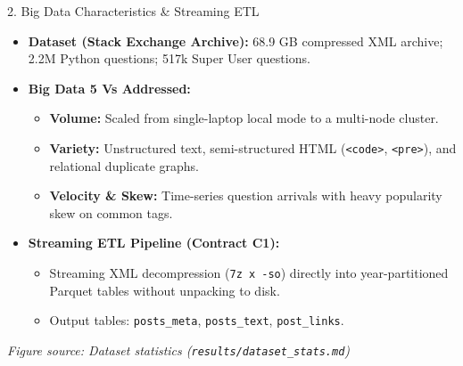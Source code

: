 \documentclass[aspectratio=169,10pt]{beamer}
\begin{document}
\begin{frame}{2. Big Data Characteristics \& Streaming ETL}
  \begin{itemize}
    \item \textbf{Dataset (Stack Exchange Archive):} 68.9 GB compressed XML archive; 2.2M Python questions; 517k Super User questions.
    \item \textbf{Big Data 5 Vs Addressed:}
      \begin{itemize}
        \item \textbf{Volume:} Scaled from single-laptop local mode to a multi-node cluster.
        \item \textbf{Variety:} Unstructured text, semi-structured HTML (\texttt{<code>}, \texttt{<pre>}), and relational duplicate graphs.
        \item \textbf{Velocity \& Skew:} Time-series question arrivals with heavy popularity skew on common tags.
      \end{itemize}
    \item \textbf{Streaming ETL Pipeline (Contract C1):}
      \begin{itemize}
        \item Streaming XML decompression (\texttt{7z x -so}) directly into year-partitioned Parquet tables without unpacking to disk.
        \item Output tables: \texttt{posts\_meta}, \texttt{posts\_text}, \texttt{post\_links}.
      \end{itemize}
  \end{itemize}
  \vfill
  \footnotesize{\textit{Figure source: Dataset statistics (\texttt{results/dataset\_stats.md})}}
\end{frame}
\end{document}
